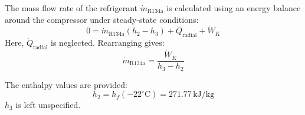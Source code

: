 The mass flow rate of the refrigerant \( \dot{m}_{\text{R134a}} \) is calculated using an energy balance around the compressor under steady-state conditions:  
\[
0 = \dot{m}_{\text{R134a}} \left( h_2 - h_3 \right) + \dot{Q}_{\text{radial}} + \dot{W}_K
\]  
Here, \( \dot{Q}_{\text{radial}} \) is neglected. Rearranging gives:  
\[
\dot{m}_{\text{R134a}} = \frac{\dot{W}_K}{h_3 - h_2}
\]  

The enthalpy values are provided:  
\[
h_2 = h_f(-22^\circ\text{C}) = 271.77 \, \text{kJ/kg}
\]  
\( h_3 \) is left unspecified.